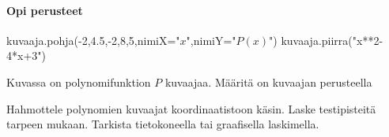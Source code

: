 \begin{tehtavasivu}

\paragraph*{Opi perusteet}


\begin{tehtava}
\begin{kuva}
	kuvaaja.pohja(-2,4.5,-2,8,5,nimiX="$x$",nimiY="$P(x)$")
	kuvaaja.piirra("x**2-4*x+3")
\end{kuva}
Kuvassa on polynomifunktion $P$ kuvaajaa. Määritä on kuvaajan perusteella
\begin{alakohdat}
\end{alakohdat}
\begin{vastaus}
\begin{alakohdat}
\end{alakohdat}
\end{vastaus}
\end{tehtava}

\begin{tehtava}
    Hahmottele polynomien kuvaajat koordinaatistoon käsin. Laske testipisteitä tarpeen mukaan. Tarkista tietokoneella tai graafisella laskimella.
    \begin{alakohdat}
    \end{alakohdat}   
    \begin{vastaus}
    	\begin{alakohdat}
		\end{alakohdat}
    \end{vastaus}
\end{tehtava}


\end{tehtavasivu}
